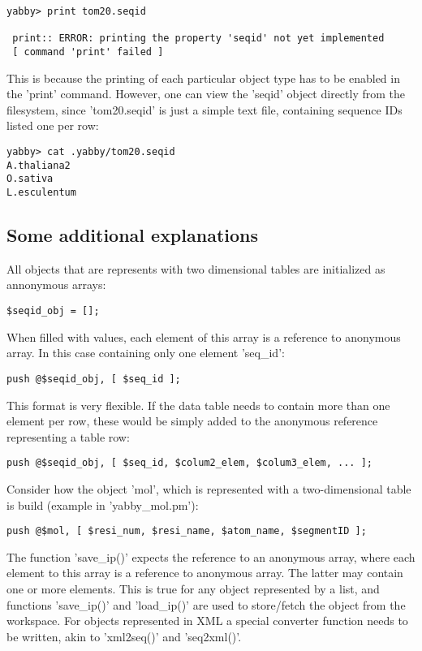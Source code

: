 \begin{verbatim}
yabby> print tom20.seqid

 print:: ERROR: printing the property 'seqid' not yet implemented
 [ command 'print' failed ]
\end{verbatim}

This is because the printing of each particular object type has to
be enabled in the 'print' command. However, one can view the 'seqid'
object directly from the filesystem, since 'tom20.seqid' is just
a simple text file, containing sequence IDs listed one per row:

\begin{verbatim}
yabby> cat .yabby/tom20.seqid
A.thaliana2
O.sativa
L.esculentum
\end{verbatim}

\subsection{Some additional explanations}

All objects that are represents with two dimensional tables are
initialized as annonymous arrays:

\begin{verbatim}
$seqid_obj = [];
\end{verbatim}

When filled with values, each element of this array is a reference
to anonymous array. In this case containing only one element 'seq\_id':

\begin{verbatim}
push @$seqid_obj, [ $seq_id ];
\end{verbatim}

This format is very flexible.  If the data table needs to contain more
than one element per row, these would be simply added to the anonymous
reference representing a table row:

\begin{verbatim}
push @$seqid_obj, [ $seq_id, $colum2_elem, $colum3_elem, ... ];
\end{verbatim}

Consider how the object 'mol', which is represented with a two-dimensional
table is build (example in 'yabby\_mol.pm'):

\begin{verbatim}
push @$mol, [ $resi_num, $resi_name, $atom_name, $segmentID ];
\end{verbatim}

The function 'save\_ip()' expects the reference to an anonymous array,
where each element to this array is a reference to anonymous array.
The latter may contain one or more elements. This is true for any
object represented by a list, and functions 'save\_ip()' and
'load\_ip()' are used to store/fetch the object from the workspace.
For objects represented in XML a special converter function needs
to be written, akin to 'xml2seq()' and 'seq2xml()'.

